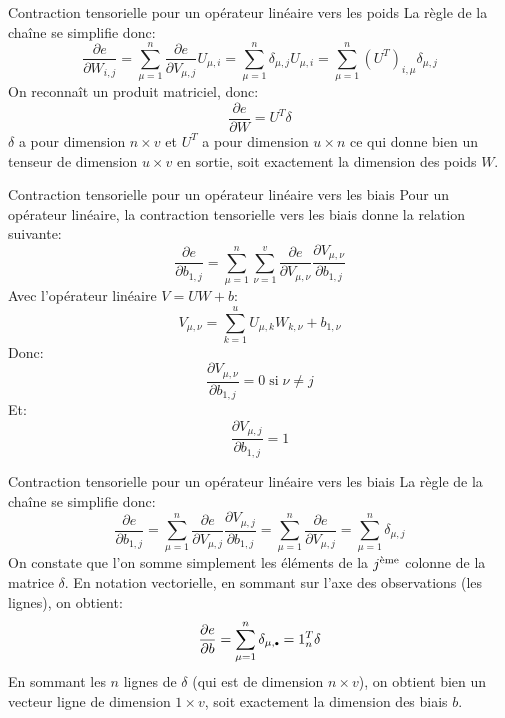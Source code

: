 \begin{frame}{Contraction tensorielle pour un opérateur linéaire vers les poids}
	La règle de la chaîne se simplifie donc:
	\begin{equation*}
		\frac{\partial{e}}{\partial{W_{i,j}}} = \sum_{\mu=1}^n \frac{\partial{e}}{\partial{V_{\mu,j}}} U_{\mu,i} = \sum_{\mu=1}^n \delta_{\mu,j} U_{\mu,i} = \sum_{\mu=1}^n \left(U^T\right)_{i,\mu} \delta_{\mu,j}
	\end{equation*}
	\pause
	On reconnaît un produit matriciel, donc:
	\begin{equation*}
		\frac{\partial{e}}{\partial{W}} = U^T \delta
	\end{equation*}
	$\delta$ a pour dimension $n \times v$ et $U^T$ a pour dimension $u \times n$ ce qui donne bien un tenseur de dimension $u \times v$ en sortie, soit exactement la dimension des poids $W$. 	
\end{frame}

\begin{frame}{Contraction tensorielle pour un opérateur linéaire vers les biais}
	Pour un opérateur linéaire, la contraction tensorielle vers les biais donne la relation suivante:
	\begin{equation*}
		\frac{\partial{e}}{\partial{b_{1,j}}} = \sum_{\mu=1}^n \sum_{\nu=1}^v \frac{\partial{e}}{\partial{V_{\mu,\nu}}} \frac{\partial{V_{\mu,\nu}}}{\partial{b_{1,j}}}
	\end{equation*}
	\pause
	Avec l'opérateur linéaire $V = U W + b$:
	\begin{equation*}
		V_{\mu,\nu} = \sum_{k=1}^u U_{\mu, k} W_{k, \nu} + b_{1,\nu}
	\end{equation*}
	\pause
	Donc:
	\begin{equation*}
		\frac{\partial{V_{\mu,\nu}}}{\partial{b_{1,j}}} = 0 \; \text{si} \; \nu \ne j
	\end{equation*}
	\pause
	Et:
	\begin{equation*}
		\frac{\partial{V_{\mu,j}}}{\partial{b_{1,j}}} = 1
	\end{equation*}
\end{frame}

\begin{frame}{Contraction tensorielle pour un opérateur linéaire vers les biais}
	La règle de la chaîne se simplifie donc:
	\begin{equation*}
		\frac{\partial{e}}{\partial{b_{1,j}}} = \sum_{\mu=1}^n \frac{\partial{e}}{\partial{V_{\mu,j}}} \frac{\partial{V_{\mu,j}}}{\partial{b_{1,j}}} = \sum_{\mu=1}^n \frac{\partial{e}}{\partial{V_{\mu,j}}} = \sum_{\mu=1}^n \delta_{\mu,j}
	\end{equation*}
	\pause
	On constate que l'on somme simplement les éléments de la $j\textsuperscript{ème}$ colonne de la matrice $\delta$. En notation vectorielle, en sommant sur l'axe des observations (les lignes), on obtient:
	\begin{equation*}
		\frac{\partial{e}}{\partial{b}} = \sum_{\mu=1}^n \delta_{\mu, \bigdot} = 1_n^T \delta
	\end{equation*}
	En sommant les $n$ lignes de $\delta$ (qui est de dimension $n \times v$), on obtient bien un vecteur ligne de dimension $1 \times v$, soit exactement la dimension des biais $b$.	
\end{frame}


